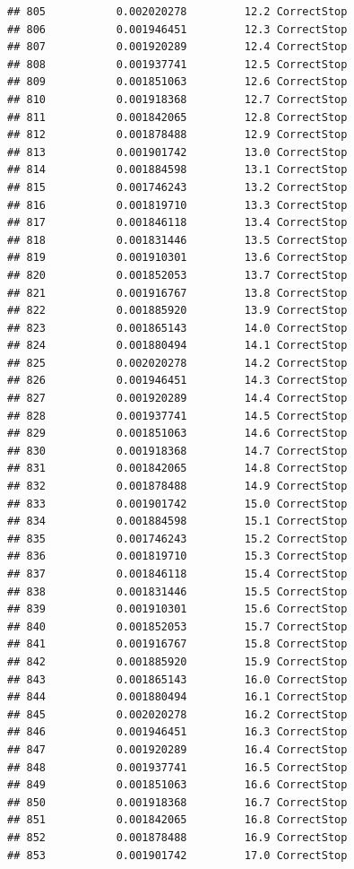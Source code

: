 \documentclass[
]{article}
\begin{document}
\begin{verbatim}
## 805           0.002020278         12.2 CorrectStop
## 806           0.001946451         12.3 CorrectStop
## 807           0.001920289         12.4 CorrectStop
## 808           0.001937741         12.5 CorrectStop
## 809           0.001851063         12.6 CorrectStop
## 810           0.001918368         12.7 CorrectStop
## 811           0.001842065         12.8 CorrectStop
## 812           0.001878488         12.9 CorrectStop
## 813           0.001901742         13.0 CorrectStop
## 814           0.001884598         13.1 CorrectStop
## 815           0.001746243         13.2 CorrectStop
## 816           0.001819710         13.3 CorrectStop
## 817           0.001846118         13.4 CorrectStop
## 818           0.001831446         13.5 CorrectStop
## 819           0.001910301         13.6 CorrectStop
## 820           0.001852053         13.7 CorrectStop
## 821           0.001916767         13.8 CorrectStop
## 822           0.001885920         13.9 CorrectStop
## 823           0.001865143         14.0 CorrectStop
## 824           0.001880494         14.1 CorrectStop
## 825           0.002020278         14.2 CorrectStop
## 826           0.001946451         14.3 CorrectStop
## 827           0.001920289         14.4 CorrectStop
## 828           0.001937741         14.5 CorrectStop
## 829           0.001851063         14.6 CorrectStop
## 830           0.001918368         14.7 CorrectStop
## 831           0.001842065         14.8 CorrectStop
## 832           0.001878488         14.9 CorrectStop
## 833           0.001901742         15.0 CorrectStop
## 834           0.001884598         15.1 CorrectStop
## 835           0.001746243         15.2 CorrectStop
## 836           0.001819710         15.3 CorrectStop
## 837           0.001846118         15.4 CorrectStop
## 838           0.001831446         15.5 CorrectStop
## 839           0.001910301         15.6 CorrectStop
## 840           0.001852053         15.7 CorrectStop
## 841           0.001916767         15.8 CorrectStop
## 842           0.001885920         15.9 CorrectStop
## 843           0.001865143         16.0 CorrectStop
## 844           0.001880494         16.1 CorrectStop
## 845           0.002020278         16.2 CorrectStop
## 846           0.001946451         16.3 CorrectStop
## 847           0.001920289         16.4 CorrectStop
## 848           0.001937741         16.5 CorrectStop
## 849           0.001851063         16.6 CorrectStop
## 850           0.001918368         16.7 CorrectStop
## 851           0.001842065         16.8 CorrectStop
## 852           0.001878488         16.9 CorrectStop
## 853           0.001901742         17.0 CorrectStop

\end{verbatim}
\end{document}
